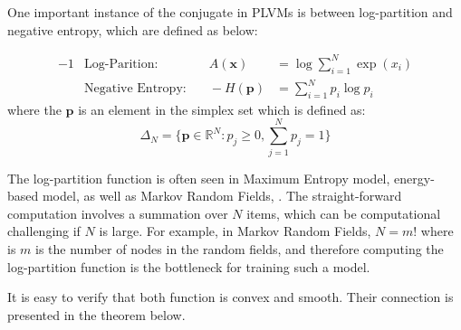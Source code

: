 One important instance of the conjugate in PLVMs is between log-partition and
negative entropy, which are defined as below:

\begin{alignat}{-1}
  &\text{Log-Parition:} & \quad
  A(\mathbf{x}) &= \log \sum\limits_{i = 1}^N \exp(x_i) \\
  &\text{Negative Entropy:} & \quad
  - H(\mathbf{p}) &= \sum\limits_{i = 1}^N p_i \log p_i
\end{alignat}
where the $\mathbf{p}$ is an element in the simplex set which is defined as:
$$\Delta_N = \{\mathbf{p} \in
  \mathbb{R}^{N}: p_j \ge 0, \sum\limits_{j=1}^N p_j = 1\}$$

The log-partition function is often seen in Maximum Entropy model, energy-based
model, as well as Markov Random Fields, \etc. The straight-forward computation
involves a summation over $N$ items, which can be computational challenging if
$N$ is large. For example, in Markov Random Fields, $N = m!$  where is $m$ is
the number of nodes in the random fields, and therefore computing the
log-partition function is the bottleneck for training such a model.

It is easy to verify that both function is convex and smooth. Their connection
is presented in the theorem below.

